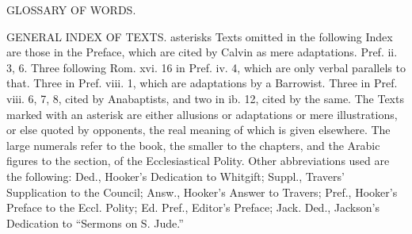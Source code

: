 GLOSSARY OF WORDS.

GENERAL INDEX OF TEXTS.
asterisks Texts omitted in the following Index are those in the Preface, which are cited by Calvin as mere adaptations. Pref. ii. 3, 6. Three following Rom. xvi. 16 in Pref. iv. 4, which are only verbal parallels to that. Three in Pref. viii. 1, which are adaptations by a Barrowist. Three in Pref. viii. 6, 7, 8, cited by Anabaptists, and two in ib. 12, cited by the same. The Texts marked with an asterisk are either allusions or adaptations or mere illustrations, or else quoted by opponents, the real meaning of which is given elsewhere. The large numerals refer to the book, the smaller to the chapters, and the Arabic figures to the section, of the Ecclesiastical Polity. Other abbreviations used are the following: Ded., Hooker’s Dedication to Whitgift; Suppl., Travers’ Supplication to the Council; Answ., Hooker’s Answer to Travers; Pref., Hooker’s Preface to the Eccl. Polity; Ed. Pref., Editor’s Preface; Jack. Ded., Jackson’s Dedication to “Sermons on S. Jude.”

